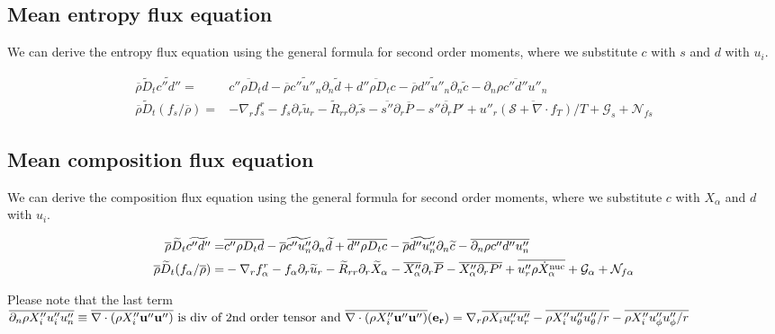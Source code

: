 \documentclass[10pt,paper=a4]{report}
\newcommand{\eht}{\overline}
\newcommand{\fht}{\widetilde}
\newcommand{\fav}{\widetilde}
\def\erho{\eht{\rho}}
\begin{document}
\subsection{Mean entropy flux equation}

We can derive the entropy flux equation using the general formula for second order moments, where we substitute $c$ with $s$ and $d$ with $u_i$.

\begin{align}
\overline{\rho}\widetilde{D}_t \widetilde{c''d''} = & \overline{c'' \rho D_t d} - \overline{\rho} \widetilde{c''u''_n}\partial_n \widetilde{d} + \overline{d'' \rho D_t c} - \overline{\rho} \widetilde{d''u''_n}\partial_n \widetilde{c} - \overline{\partial_n \rho c''d''u''_n} \\
\erho \fav{D}_t (f_s / \eht{\rho}) = &  -\nabla_r f_s^r - f_s \partial_r \fht{u}_r - \fht{R}_{rr} \partial_r \fht{s} -\eht{s''}\partial_r \eht{P} - \eht{s''\partial_r P'} + \eht{u''_r ( {\mathcal S} + \nabla \cdot f_T)  / T} + {\mathcal G_s} + {\mathcal N_{fs}}  \label{eq:rans_fs}
\end{align}

\subsection{Mean composition flux equation}

We can derive the composition flux equation using the general formula for second order moments, where we substitute $c$ with $X_\alpha$ and $d$ with $u_i$.

\begin{align}
\overline{\rho}\widetilde{D}_t \widetilde{c''d''} = & \overline{c'' \rho D_t d} - \overline{\rho} \widetilde{c''u''_n}\partial_n \widetilde{d} + \overline{d'' \rho D_t c} - \overline{\rho} \widetilde{d''u''_n}\partial_n \widetilde{c} - \overline{\partial_n \rho c''d''u''_n} \\
\erho \fav{D}_t (f_\alpha / \eht{\rho}) = &  -\nabla_r f_\alpha^r  - f_\alpha \partial_r \fht{u}_r - \fht{R}_{rr} \partial_r \fht{X}_\alpha -\eht{X''_\alpha} \partial_r \eht{P} - \eht{X''_\alpha \partial_r P'} + \overline{u''_r \rho \dot{X}_\alpha^{\rm nuc}} + {\mathcal G_\alpha} + {\mathcal N_{f\alpha}} \label{eq:rans_falpha} \\
\end{align}

\noindent Please note that the last term $ {\overline{\partial_n \rho X''_i u''_i u''_n}} \equiv \eht{\nabla \cdot (\rho X''_i {\bf{u''}} {\bf{u''}})} {\mbox{\ is div of 2nd order tensor}} \mbox{ and } \eht{\nabla \cdot (\rho X''_i {\bf{u''}} {\bf{u''}})}({\bf{e_r}}) = \nabla_r \eht{\rho X_i u''_r u''_r}  -\eht{\rho X''_i u''_\theta u''_\theta/r} - \eht{\rho X''_i u''_\phi u''_\phi/r} $\\
\end{document}
